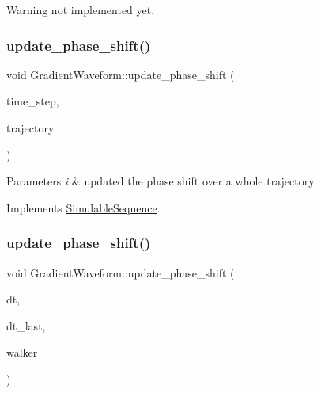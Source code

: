 \begin{DoxyWarning}{Warning}
not implemented yet. 
\end{DoxyWarning}
\mbox{\label{class_gradient_waveform_a2c606400c648cebd85827efa8d22b6bc}} 
\subsubsection{\texorpdfstring{update\+\_\+phase\+\_\+shift()}{update\_phase\_shift()}\hspace{0.1cm}{\footnotesize\ttfamily [1/2]}}
{\footnotesize\ttfamily void Gradient\+Waveform\+::update\+\_\+phase\+\_\+shift (\begin{DoxyParamCaption}\item[{double}]{time\+\_\+step,  }\item[{Eigen\+::\+Matrix3\+Xd}]{trajectory }\end{DoxyParamCaption})\hspace{0.3cm}{\ttfamily [virtual]}}


\begin{DoxyParams}{Parameters}
{\em i} & updated the phase shift over a whole trajectory \\
\hline
\end{DoxyParams}


Implements \hyperlink{class_simulable_sequence_a175197d165ee7852094bc70cadc59589}{Simulable\+Sequence}.

\mbox{\label{class_gradient_waveform_a7421301b24b6c98e28ef9430287cdf8e}} 
\subsubsection{\texorpdfstring{update\+\_\+phase\+\_\+shift()}{update\_phase\_shift()}\hspace{0.1cm}{\footnotesize\ttfamily [2/2]}}
{\footnotesize\ttfamily void Gradient\+Waveform\+::update\+\_\+phase\+\_\+shift (\begin{DoxyParamCaption}\item[{double}]{dt,  }\item[{double}]{dt\+\_\+last,  }\item[{\hyperlink{class_walker}{Walker}}]{walker }\end{DoxyParamCaption})\hspace{0.3cm}{\ttfamily [virtual]}}


